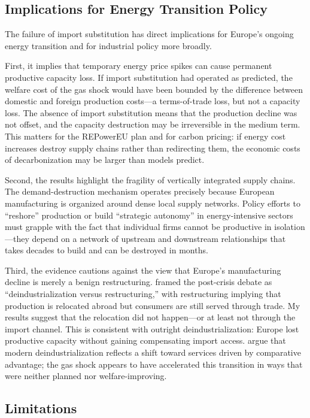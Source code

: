 \documentclass[12pt]{article}
\begin{document}
\subsection{Implications for Energy Transition Policy}

The failure of import substitution has direct implications for Europe's ongoing energy transition and for industrial policy more broadly.

First, it implies that temporary energy price spikes can cause permanent productive capacity loss. If import substitution had operated as predicted, the welfare cost of the gas shock would have been bounded by the difference between domestic and foreign production costs---a terms-of-trade loss, but not a capacity loss. The absence of import substitution means that the production decline was not offset, and the capacity destruction may be irreversible in the medium term. This matters for the REPowerEU plan and for carbon pricing: if energy cost increases destroy supply chains rather than redirecting them, the economic costs of decarbonization may be larger than models predict.

Second, the results highlight the fragility of vertically integrated supply chains. The demand-destruction mechanism operates precisely because European manufacturing is organized around dense local supply networks. Policy efforts to ``reshore'' production or build ``strategic autonomy'' in energy-intensive sectors must grapple with the fact that individual firms cannot be productive in isolation---they depend on a network of upstream and downstream relationships that takes decades to build and can be destroyed in months.

Third, the evidence cautions against the view that Europe's manufacturing decline is merely a benign restructuring. \citet{pisaniferry2022} framed the post-crisis debate as ``deindustrialization versus restructuring,'' with restructuring implying that production is relocated abroad but consumers are still served through trade. My results suggest that the relocation did not happen---or at least not through the import channel. This is consistent with outright deindustrialization: Europe lost productive capacity without gaining compensating import access. \citet{haskel2022} argue that modern deindustrialization reflects a shift toward services driven by comparative advantage; the gas shock appears to have accelerated this transition in ways that were neither planned nor welfare-improving.

\subsection{Limitations}
\end{document}
